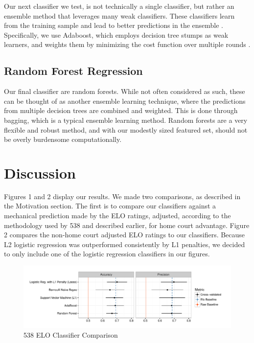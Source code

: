 \documentclass[12pt]{article}
\begin{document}
Our next classifier we test, is not technically a single classifier, but rather an ensemble method that leverages many weak classifiers. These classifiers learn from the training sample and lead to better predictions in the ensemble \citep{breiman}. Specifically, we use Adaboost, which employs decision tree stumps as weak learners, and weights them by minimizing the cost function over multiple rounds \citep{ratsch}. 

\subsection{Random Forest Regression}

Our final classifier are random forests. While not often considered as such, these can be thought of as another ensemble learning technique, where the predictions from multiple decision trees are combined and weighted. This is done through bagging, which is a typical ensemble learning method. Random forests are a very flexible and robust method, and with our modestly sized featured set, should not be overly burdensome computationally.

\section{Discussion}
Figures 1 and 2 display our results. We made two comparisons, as described in the Motivation section. The first is to compare our classifiers against a mechanical prediction made by the ELO ratings, adjusted, according to the methodology used by 538 and described earlier, for home court advantage. Figure 2 compares the non-home court adjusted ELO ratings to our classifiers. Because L2 logistic regression was outperformed consistently by L1 penalties, we decided to only include one of the logistic regression classifiers in our figures.

\begin{figure}
\caption{538 ELO Classifier Comparison}
\includegraphics[]{01a-538-classifier-comparison.pdf}
\end{figure}
\end{document}
